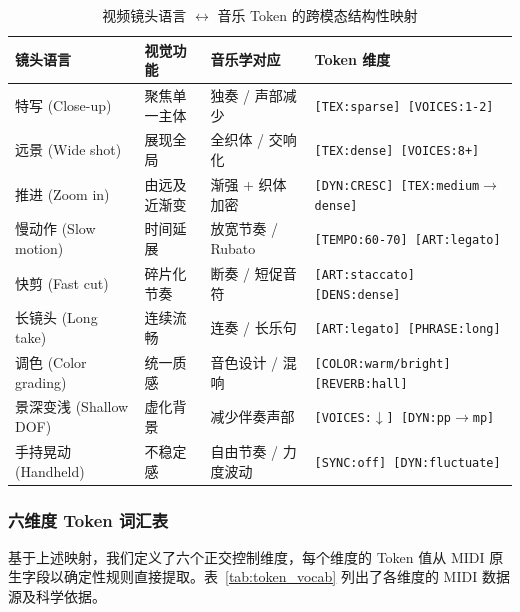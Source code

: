 \documentclass[UTF8,12pt,a4paper]{ctexart}
\begin{document}
\begin{table}[t]
\centering
\small
\caption{视频镜头语言 $\leftrightarrow$ 音乐 Token 的跨模态结构性映射}
\label{tab:mapping}
\begin{tabularx}{\textwidth}{@{}l >{\raggedright\arraybackslash}X l >{\raggedright\arraybackslash}X@{}}
\toprule
\textbf{镜头语言} & \textbf{视觉功能} & \textbf{音乐学对应} & \textbf{Token 维度} \\
\midrule
特写 (Close-up) & 聚焦单一主体 & 独奏 / 声部减少 & \texttt{[TEX:sparse] [VOICES:1-2]} \\
远景 (Wide shot) & 展现全局 & 全织体 / 交响化 & \texttt{[TEX:dense] [VOICES:8+]} \\
推进 (Zoom in) & 由远及近渐变 & 渐强 + 织体加密 & \texttt{[DYN:CRESC] [TEX:medium$\to$dense]} \\
慢动作 (Slow motion) & 时间延展 & 放宽节奏 / Rubato & \texttt{[TEMPO:60-70] [ART:legato]} \\
快剪 (Fast cut) & 碎片化节奏 & 断奏 / 短促音符 & \texttt{[ART:staccato] [DENS:dense]} \\
长镜头 (Long take) & 连续流畅 & 连奏 / 长乐句 & \texttt{[ART:legato] [PHRASE:long]} \\
调色 (Color grading) & 统一质感 & 音色设计 / 混响 & \texttt{[COLOR:warm/bright] [REVERB:hall]} \\
景深变浅 (Shallow DOF) & 虚化背景 & 减少伴奏声部 & \texttt{[VOICES:$\downarrow$] [DYN:pp$\to$mp]} \\
手持晃动 (Handheld) & 不稳定感 & 自由节奏 / 力度波动 & \texttt{[SYNC:off] [DYN:fluctuate]} \\
\bottomrule
\end{tabularx}
\end{table}

\subsubsection{六维度 Token 词汇表}

基于上述映射，我们定义了六个正交控制维度，每个维度的 Token 值从 MIDI 原生字段以确定性规则直接提取。表~\ref{tab:token_vocab} 列出了各维度的 MIDI 数据源及科学依据。
\end{document}
